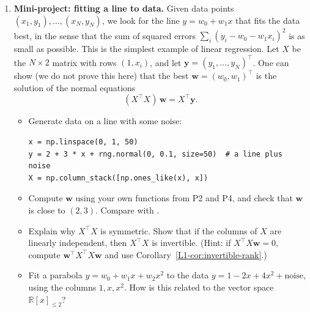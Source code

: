 \begin{enumerate}[label=\textbf{P\arabic*.}, leftmargin=*]
    \item \textbf{Mini-project: fitting a line to data.} Given data points $(x_1, y_1), \ldots, (x_N, y_N)$, we look for the line $y = w_0 + w_1 x$ that fits the data best, in the sense that the sum of squared errors $\sum_i (y_i - w_0 - w_1 x_i)^2$ is as small as possible. This is the simplest example of linear regression. Let $X$ be the $N \times 2$ matrix with rows $(1, x_i)$, and let $\mathbf{y} = (y_1, \ldots, y_N)^\top$. One can show (we do not prove this here) that the best $\mathbf{w} = (w_0, w_1)^\top$ is the solution of the normal equations
    \[(X^\top X)\, \mathbf{w} = X^\top \mathbf{y}.\]
    \begin{itemize}
        \item Generate data on a line with some noise:
\begin{lstlisting}
x = np.linspace(0, 1, 50)
y = 2 + 3 * x + rng.normal(0, 0.1, size=50)  # a line plus noise
X = np.column_stack([np.ones_like(x), x])
\end{lstlisting}
        \item Compute $\mathbf{w}$ using your own functions from P2 and P4, and check that $\mathbf{w}$ is close to $(2, 3)$. Compare with .
        \item Explain why $X^\top X$ is symmetric. Show that if the columns of $X$ are linearly independent, then $X^\top X$ is invertible. (Hint: if $X^\top X \mathbf{w} = 0$, compute $\mathbf{w}^\top X^\top X \mathbf{w}$ and use Corollary~\ref{L1-cor:invertible-rank}.)
        \item Fit a parabola $y = w_0 + w_1 x + w_2 x^2$ to the data $y = 1 - 2x + 4x^2 + \text{noise}$, using the columns $1, x, x^2$. How is this related to the vector space $\mathbb{R}[x]_{\leq 2}$?
    \end{itemize}


\end{enumerate}
